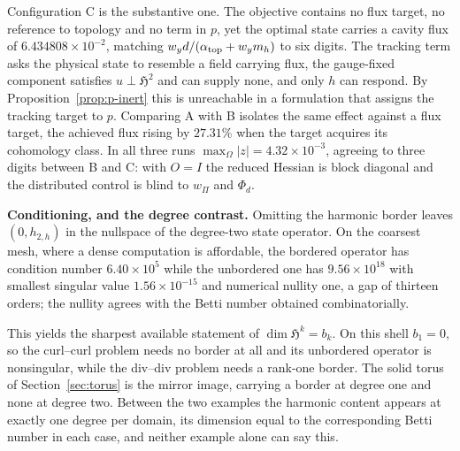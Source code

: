 \documentclass{article}
\newcommand{\HH}{\mathfrak H}
\begin{document}
Configuration C is the substantive one. The objective contains no flux
target, no reference to topology and no term in $p$, yet the optimal
state carries a cavity flux of $6.434808\times10^{-2}$, matching
$w_y d/(\alpha_{\rm top}+w_y m_h)$ to six digits. The tracking term
asks the physical state to resemble a field carrying flux, the
gauge-fixed component satisfies $u\perp\HH^2$ and can supply none, and
only $h$ can respond. By Proposition~\ref{prop:p-inert} this is
unreachable in a formulation that assigns the tracking target to $p$.
Comparing A with B isolates the same effect against a flux target, the
achieved flux rising by $27.31\%$ when the target acquires its
cohomology class. In all three runs
$\max_\Omega|z|=4.32\times10^{-3}$, agreeing to three digits between B
and C: with $O=I$ the reduced Hessian is block diagonal and the
distributed control is blind to $w_\Pi$ and $\Phi_d$.
 
\medskip
\noindent\textbf{Conditioning, and the degree contrast.}
Omitting the harmonic border leaves $(0,h_{2,h})$ in the nullspace of
the degree-two state operator. On the coarsest mesh, where a dense
computation is affordable, the bordered operator has condition number
$6.40\times10^5$ while the unbordered one has $9.56\times10^{18}$ with
smallest singular value $1.56\times10^{-15}$ and numerical nullity one,
a gap of thirteen orders; the nullity agrees with the Betti number
obtained combinatorially.
 
This yields the sharpest available statement of $\dim\HH^k=b_k$. On
this shell $b_1=0$, so the curl--curl problem needs no border at all
and its unbordered operator is nonsingular, while the div--div problem
needs a rank-one border. The solid torus of Section~\ref{sec:torus} is
the mirror image, carrying a border at degree one and none at degree
two. Between the two examples the harmonic content appears at exactly
one degree per domain, its dimension equal to the corresponding Betti
number in each case, and neither example alone can say this.
\end{document}

